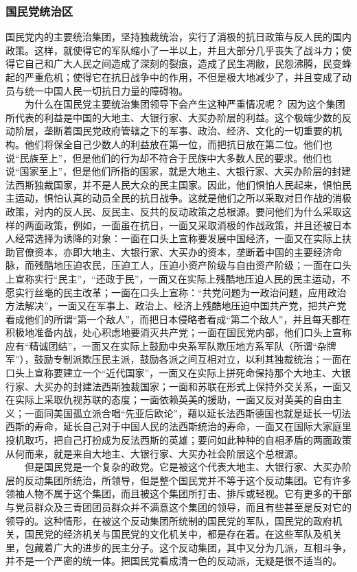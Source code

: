 \documentclass[cn,11pt,chinese]{elegantbook}
\def\myformat#1{\hfil\hfil #1}
\begin{document}
\subsubsection*{\myformat{国民党统治区}}
国民党内的主要统治集团，坚持独裁统治，实行了消极的抗日政策与反人民的国内政策。这样，就使得它的军队缩小了一半以上，并且大部分几乎丧失了战斗力；使得它自己和广大人民之间造成了深刻的裂痕，造成了民生凋敝，民怨沸腾，民变蜂起的严重危机；使得它在抗日战争中的作用，不但是极大地减少了，并且变成了动员与统一中国人民一切抗日力量的障碍物。\\
　　为什么在国民党主要统治集团领导下会产生这种严重情况呢？ 因为这个集团所代表的利益是中国的大地主、大银行家、大买办阶层的利益。这个极端少数的反动阶层，垄断着国民党政府管辖之下的军事、政治、经济、文化的一切重要的机构。他们将保全自己少数人的利益放在第一位，而把抗日放在第二位。他们也说“民族至上”，但是他们的行为却不符合于民族中大多数人民的要求。他们也说“国家至上”，但是他们所指的国家，就是大地主、大银行家、大买办阶层的封建法西斯独裁国家，并不是人民大众的民主国家。因此，他们惧怕人民起来，惧怕民主运动，惧怕认真的动员全民的抗日战争。这就是他们之所以采取对日作战的消极政策，对内的反人民、反民主、反共的反动政策之总根源。要问他们为什么采取这样的两面政策，例如，一面虽在抗日，一面又采取消极的作战政策，并且还被日本人经常选择为诱降的对象：一面在口头上宣称要发展中国经济，一面又在实际上扶助官僚资本，亦即大地主、大银行家、大买办的资本，垄断着中国的主要经济命脉，而残酷地压迫农民，压迫工人，压迫小资产阶级与自由资产阶级；一面在口头上宣称实行“民主”，“还政于民”，一面又在实际上残酷地压迫人民的民主运动，不愿实行丝毫的民主改革；一面在口头上宣称：“共党问题为一政治问题，应用政治方法解决”，一面又在军事上、政治上、经济上残酷地压迫中国共产党，把共产党看成他们的所谓“第一个敌人”，而把日本侵略者看成“第二个敌人”，并且每天都在积极地准备内战，处心积虑地要消灭共产党；一面在国民党内部，他们口头上宣称应有“精诚团结”，一面又在实际上鼓励中央系军队欺压地方系军队（所谓“杂牌军”），鼓励专制派欺压民主派，鼓励各派之间互相对立，以利其独裁统治；一面在口头上宣称要建立一个“近代国家”，一面又在实际上拼死命保持那个大地主、大银行家、大买办的封建法西斯独裁国家；一面和苏联在形式上保持外交关系，一面又在实际上采取仇视苏联的态度；一面依赖英美的援助，一面又反对英美的自由主义；一面同美国孤立派合唱“先亚后欧论”，藉以延长法西斯德国也就是延长一切法西斯的寿命，延长自己对于中国人民的法西斯统治的寿命，一面又在国际大家庭里投机取巧，把自己打扮成为反法西斯的英雄；要问如此种种的自相矛盾的两面政策从何而来，就是来自大地主、大银行家、大买办社会阶层这个总根源。\\
　　但是国民党是一个复杂的政党。它是被这个代表大地主、大银行家、大买办阶层的反动集团所统治，所领导，但是整个国民党并不等于这个反动集团。它有许多领袖人物不属于这个集团，而且被这个集团所打击、排斥或轻视。它有更多的干部与党员群众及三青团团员群众并不满意这个集团的领导，而且有些甚至是反对它的领导的。这种情形，在被这个反动集团所统制的国民党的军队，国民党的政府机关，国民党的经济机关与国民党的文化机关中，都是存在着。在这些军队及机关里，包藏着广大的进步的民主分子。这个反动集团，其中又分为几派，互相斗争，并不是一个严密的统一体。把国民党看成清一色的反动派，无疑是很不适当的。\\
\end{document}
